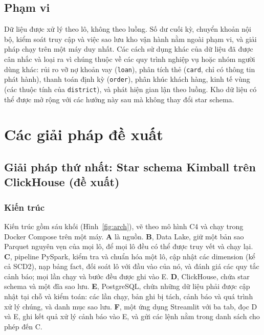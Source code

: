 \documentclass[peerreview]{IEEEtran}
\newcommand{\tbl}[1]{\texttt{#1}}
\begin{document}
\subsection{Phạm vi}
\label{sec:other-directions}
Dữ liệu được xử lý theo lô, không theo luồng. Số dư cuối kỳ, chuyển khoản nội bộ, kiểm soát
truy cập và việc sao lưu kho vận hành nằm ngoài phạm vi, và giải pháp chạy trên một máy duy
nhất. Các cách sử dụng khác của dữ liệu đã được cân nhắc và loại ra vì chúng thuộc về các quy
trình nghiệp vụ hoặc nhóm người dùng khác: rủi ro vỡ nợ khoản vay (\tbl{loan}), phân tích thẻ
(\tbl{card}, chỉ có thông tin phát hành), thanh toán định kỳ (\tbl{order}), phân khúc khách
hàng, kinh tế vùng (các thuộc tính của \tbl{district}), và phát hiện gian lận theo luồng.
Kho dữ liệu có thể được mở rộng với các hướng này sau mà không thay đổi star schema.


\section{Các giải pháp đề xuất}
\label{sec:solutions}

\subsection{Giải pháp thứ nhất: Star schema Kimball trên ClickHouse (đề xuất)}
\label{sec:sol-kimball}

\subsubsection{Kiến trúc}
Kiến trúc gồm sáu khối (Hình~\ref{fig:arch}), vẽ theo mô hình C4 \cite{c4model} và chạy
trong Docker Compose trên một máy. \textbf{A} là nguồn. \textbf{B}, Data Lake, giữ một bản
sao Parquet nguyên vẹn của mọi lô, để mọi lô đều có thể được truy vết và chạy lại.
\textbf{C}, pipeline PySpark, kiểm tra và chuẩn hóa một lô, cập nhật các dimension (kể cả
SCD2), nạp bảng fact, đối soát lô với đầu vào của nó, và đánh giá các quy tắc cảnh báo; mọi
lần chạy và bước đều được ghi vào E. \textbf{D}, ClickHouse, chứa star schema và một đĩa sao
lưu. \textbf{E}, PostgreSQL, chứa những dữ liệu phải được cập nhật tại chỗ và kiểm toán: các
lần chạy, bản ghi bị tách, cảnh báo và quá trình xử lý chúng, và danh mục sao lưu.
\textbf{F}, một ứng dụng Streamlit với ba tab, đọc D và E, ghi kết quả xử lý cảnh báo vào E,
và gửi các lệnh nằm trong danh sách cho phép đến C.
\end{document}
